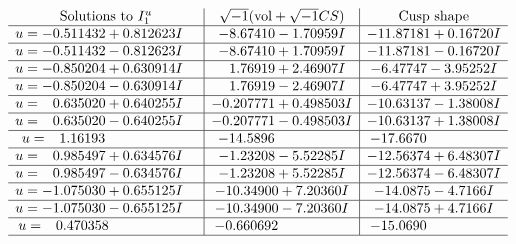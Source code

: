 \documentclass[1p]{elsarticle_modified}
\theoremstyle{definition}
\newcommand{\I}{\sqrt{-1}}
\begin{document}
$$\begin{array}{c|c|c}  
\text{Solutions to }I^u_{1}& \I (\text{vol} + \sqrt{-1}CS) & \text{Cusp shape}\\
 \hline 
\begin{aligned}
u &= -0.511432 + 0.812623 I\end{aligned}
 & -8.67410 - 1.70959 I & -11.87181 + 0.16720 I \\ \hline\begin{aligned}
u &= -0.511432 - 0.812623 I\end{aligned}
 & -8.67410 + 1.70959 I & -11.87181 - 0.16720 I \\ \hline\begin{aligned}
u &= -0.850204 + 0.630914 I\end{aligned}
 & \phantom{-}1.76919 + 2.46907 I & -6.47747 - 3.95252 I \\ \hline\begin{aligned}
u &= -0.850204 - 0.630914 I\end{aligned}
 & \phantom{-}1.76919 - 2.46907 I & -6.47747 + 3.95252 I \\ \hline\begin{aligned}
u &= \phantom{-}0.635020 + 0.640255 I\end{aligned}
 & -0.207771 + 0.498503 I & -10.63137 - 1.38008 I \\ \hline\begin{aligned}
u &= \phantom{-}0.635020 - 0.640255 I\end{aligned}
 & -0.207771 - 0.498503 I & -10.63137 + 1.38008 I \\ \hline\begin{aligned}
u &= \phantom{-}1.16193\phantom{ +0.000000I}\end{aligned}
 & -14.5896\phantom{ +0.000000I} & -17.6670\phantom{ +0.000000I} \\ \hline\begin{aligned}
u &= \phantom{-}0.985497 + 0.634576 I\end{aligned}
 & -1.23208 - 5.52285 I & -12.56374 + 6.48307 I \\ \hline\begin{aligned}
u &= \phantom{-}0.985497 - 0.634576 I\end{aligned}
 & -1.23208 + 5.52285 I & -12.56374 - 6.48307 I \\ \hline\begin{aligned}
u &= -1.075030 + 0.655125 I\end{aligned}
 & -10.34900 + 7.20360 I & -14.0875 - 4.7166 I \\ \hline\begin{aligned}
u &= -1.075030 - 0.655125 I\end{aligned}
 & -10.34900 - 7.20360 I & -14.0875 + 4.7166 I \\ \hline\begin{aligned}
u &= \phantom{-}0.470358\phantom{ +0.000000I}\end{aligned}
 & -0.660692\phantom{ +0.000000I} & -15.0690\phantom{ +0.000000I}\\
 \hline 
 \end{array}$$\newpage\newpage\renewcommand{\arraystretch}{1}
\end{document}
